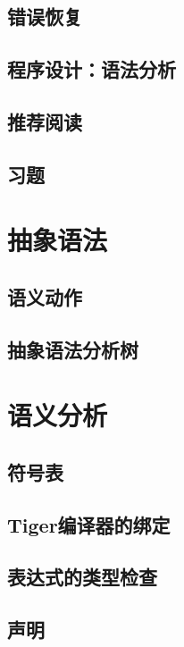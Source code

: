 \documentclass[cn,11pt,chinese]{elegantbook}
\begin{document}
\section{错误恢复}

\section{程序设计：语法分析}

\section{推荐阅读}

\section{习题}

\chapter{抽象语法}

\section{语义动作}

\section{抽象语法分析树}

\chapter{语义分析}

\section{符号表}

\section{Tiger编译器的绑定}

\section{表达式的类型检查}

\section{声明}
\end{document}
